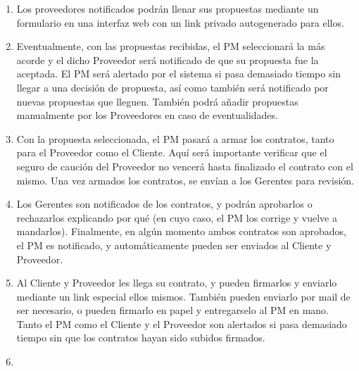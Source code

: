 \begin{enumerate}
    \item Los proveedores notificados podrán llenar sus propuestas mediante un 
    formulario en una interfaz web con un link privado autogenerado para ellos. 
    
    \item Eventualmente, con las propuestas recibidas, el PM seleccionará la más acorde 
    y el dicho Proveedor será notificado de que su propuesta fue la aceptada. 
    El PM será alertado por el sistema si pasa demasiado tiempo sin llegar a una 
    decisión de propuesta, así como también será notificado por nuevas propuestas 
    que lleguen. También podrá añadir propuestas manualmente por los Proveedores en 
    caso de eventualidades. 
    
    \item Con la propuesta seleccionada, el PM pasará a armar los contratos, 
    tanto para el Proveedor como el Cliente. Aquí será importante verificar que 
    el seguro de caución del Proveedor no vencerá hasta finalizado el contrato con 
    el mismo. Una vez armados los contratos, se envían a los Gerentes para revisión. 
    
    \item Los Gerentes son notificados de los contratos, y podrán aprobarlos o 
    rechazarlos explicando por qué (en cuyo caso, el PM los corrige y vuelve a mandarlos). 
    Finalmente, en algún momento ambos contratos son aprobados, el PM es notificado, 
    y automáticamente pueden ser enviados al Cliente y Proveedor. 
    
    \item Al Cliente y Proveedor les llega su contrato, y pueden firmarlos y enviarlo 
    mediante un link especial ellos mismos. También pueden enviarlo por mail de ser 
    necesario, o pueden firmarlo en papel y entregarselo al PM en mano. 
    Tanto el PM como el Cliente y el Proveedor son alertados si pasa demasiado tiempo 
    sin que los contratos hayan sido subidos firmados. 
    
    \item 
\end{enumerate}
